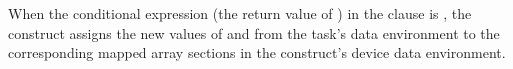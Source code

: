 When the conditional expression (the return value of ) in the 
 clause is , the   construct 
assigns the new values of  and  from the task's data environment to the corresponding 
mapped array sections in the   construct's device data 
environment.



